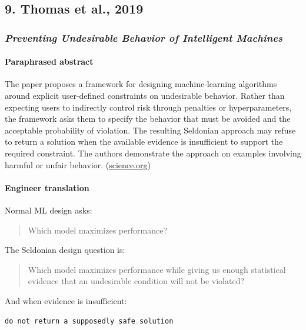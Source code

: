 \subsection{9. Thomas et al., 2019}\label{thomas-et-al.-2019}

\subsubsection{\texorpdfstring{\emph{Preventing Undesirable Behavior of Intelligent Machines}}{Preventing Undesirable Behavior of Intelligent Machines}}\label{preventing-undesirable-behavior-of-intelligent-machines}

\paragraph{Paraphrased abstract}\label{paraphrased-abstract-8}

The paper proposes a framework for designing machine-learning algorithms around explicit user-defined constraints on undesirable behavior. Rather than expecting users to indirectly control risk through penalties or hyperparameters, the framework asks them to specify the behavior that must be avoided and the acceptable probability of violation. The resulting Seldonian approach may refuse to return a solution when the available evidence is insufficient to support the required constraint. The authors demonstrate the approach on examples involving harmful or unfair behavior. (\href{https://www.science.org/doi/10.1126/science.aag3311?utm_source=chatgpt.com}{science.org})

\paragraph{Engineer translation}\label{engineer-translation-8}

Normal ML design asks:

\begin{quote}
Which model maximizes performance?
\end{quote}

The Seldonian design question is:

\begin{quote}
Which model maximizes performance while giving us enough statistical evidence that an undesirable condition will not be violated?
\end{quote}

And when evidence is insufficient:

\begin{lstlisting}
do not return a supposedly safe solution
\end{lstlisting}

